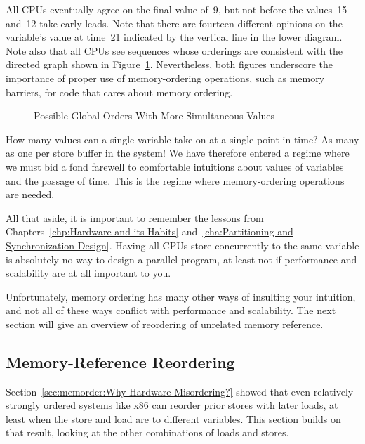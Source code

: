 All CPUs eventually agree on the final value of~9, but not before
the values~15 and~12 take early leads.
Note that there are fourteen different opinions on the variable's value
at time~21 indicated by the vertical line in the lower diagram.
Note also that all CPUs see sequences whose orderings are consistent with
the directed graph shown in
Figure~\ref{fig:memorder:Possible Global Orders With More Simultaneous Values}.
Nevertheless, both figures underscore the importance of
proper use of memory-ordering operations, such as memory barriers,
for code that cares about memory ordering.

\begin{figure}[htb]
\centering
{}
\caption{Possible Global Orders With More Simultaneous Values}
\label{fig:memorder:Possible Global Orders With More Simultaneous Values}
\end{figure}

How many values can a single variable take on at a single point in
time?
As many as one per store buffer in the system!
We have therefore entered a regime where we must bid a fond farewell to
comfortable intuitions about values of variables and the passage of time.
This is the regime where memory-ordering operations are needed.

All that aside, it is important to remember the lessons from
Chapters~\ref{chp:Hardware and its Habits}
and~\ref{cha:Partitioning and Synchronization Design}.
Having all CPUs store concurrently to the same variable
is absolutely no way to design a parallel program, at least
not if performance and scalability are at all important to you.

Unfortunately, memory ordering has many other ways of insulting your
intuition, and not all of these ways conflict with performance and
scalability.
The next section will give an overview of reordering of unrelated
memory reference.

\subsection{Memory-Reference Reordering}
\label{sec:memorder:Memory-Reference Reordering}

Section~\ref{sec:memorder:Why Hardware Misordering?}
showed that even relatively strongly ordered systems like x86
can reorder prior stores with later loads, at least when the
store and load are to different variables.
This section builds on that result, looking at the other combinations of
loads and stores.


